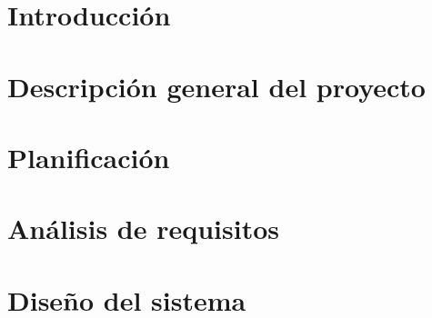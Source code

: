 \documentclass[a4paper,11pt]{book}
\begin{document}
\renewcommand{\figurename}{Figura}
\renewcommand{\listfigurename}{Indice de figuras}
\renewcommand{\tablename}{Tabla}
\renewcommand{\listtablename}{Indice de tablas}

\pagestyle{empty}

\cleardoublepage


\cleardoublepage
\pagestyle{plain}

\frontmatter %



\tableofcontents
\listoffigures
\listoftables

\mainmatter %

\chapter{Introducción}


\chapter{Descripción general del proyecto}


\chapter{Planificación}


\chapter{Análisis de requisitos}


\chapter{Diseño del sistema}


\backmatter %


\clearpage
{}





\end{document}
